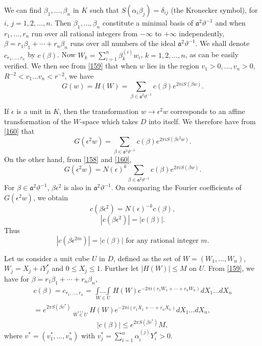 We can find $\beta_{1},\ldots,\beta_{n}$ in $K$ such that
$S(\alpha_{i}\beta_{j})=\delta_{ij}$ (the Kronecker symbol), for $i$,
$j=1,2,\ldots,n$. Then $\beta_{1},\ldots,\beta_{n}$ constitute a
minimal basis of $\mathfrak{a}^{2}\vartheta^{-1}$ and when
$r_{1},\ldots,r_{n}$ run over all rational integers from $-\infty$ to
$+\infty$ independently, $\beta=r_{1}\beta_{1}+\cdots+r_{n}\beta_{n}$
runs over all numbers of the ideal
$\mathfrak{a}^{2}\vartheta^{-1}$. We shall denote
$c_{r_{1},\ldots,r_{n}}$ by $c(\beta)$. Now
$W_{k}=\sum\limits^{n}_{i=1}\beta^{(i)}_{k}w_{i}$, $k=1,2,\ldots,n$,
as can be easily verified. We then see from \eqref{159} that when $w$
lies in the region $v_{1}>0,\ldots,v_{n}>0$, $R^{-2}<v_{1}\ldots
v_{n}<r^{-2}$, we have
\begin{equation*}
G(w)=H(W)=\sum_{\beta\in
  \mathfrak{a}^{2}\vartheta^{-1}}c(\beta)e^{2\pi iS(\beta
  w)}.\tag{160}\label{160} 
\end{equation*}

If $\epsilon$ is a unit in $K$, then the transformation $w\to
\epsilon^{2}w$ corresponds to an affine transformation of the
$W$-space which takes $D$ into itself. We therefore have from
\eqref{160} that
$$
G(\epsilon^{2}w)=\sum_{\beta\in
  \mathfrak{a}^{2}\vartheta^{-1}}c(\beta)e^{2\pi
  iS(\beta\epsilon^{2}w)}.
$$
On the other hand, from \eqref{158} and \eqref{160},
$$
G(\epsilon^{2}w)=N(\epsilon)^{k}\sum_{\beta\in\mathfrak{a}^{2}\vartheta^{-1}}c(\beta)e^{2\pi
  iS(\beta w)}. 
$$\pageoriginale
For $\beta\in\mathfrak{a}^{2}\vartheta^{-1}$, $\beta\epsilon^{2}$ is
also in $\mathfrak{a}^{2}\vartheta^{-1}$. On comparing the Fourier
coefficients of $G(\epsilon^{2}w)$, we obtain
$$
c(\beta\epsilon^{2})=N(\epsilon)^{-k}c(\beta),
$$
\ie
$$
|c(\beta\epsilon^{2})|=|c(\beta)|.
$$
Thus
$$
|c(\beta\epsilon^{2m})|=|c(\beta)|\text{ for any rational integer } m.
$$

Let us consider a unit cube $U$ in $D$, defined as the set of
$W=(W_{1},\ldots,W_{n})$, $W_{j}=X_{j}+iY^{\ast}_{j}$ and $0\leq
X_{j}\leq 1$. Further let $|H(W)|\leq M$ on $U$. From \eqref{159}, we
have for $\beta=r_{1}\beta_{1}+\cdots+r_{n}\beta_{n}$,
\begin{multline*}
c(\beta)=c_{r_{1},\ldots,r_{n}}=\mathop{\int\ldots\int}\limits_{W\in
  U} H(W)e^{-2\pi i(r_{1}W_{1}+\cdots+r_{n}W_{n})}dX_{1}\ldots
dX_{n}\\
=e^{2\pi S(\beta
  v^{\ast})}\mathop{\int^{1}_{0}\ldots\int^{1}_{0}}\limits_{W\in U}
H(W)e^{-2\pi i(r_{1}X_{1}+\cdots+r_{n}X_{n})}dX_{1}\ldots dX_{n}, 
\end{multline*}
\ie
$$
|c(\beta)|\leq e^{2\pi S(\beta v^{\ast})}M,
$$
where $v^{\ast}=(v^{\ast}_{1},\ldots,v^{\ast}_{n})$ with
$v^{\ast}_{j}=\sum\limits^{n}_{i=1}\alpha^{(j)}_{i}Y^{\ast}_{i}>0$.

